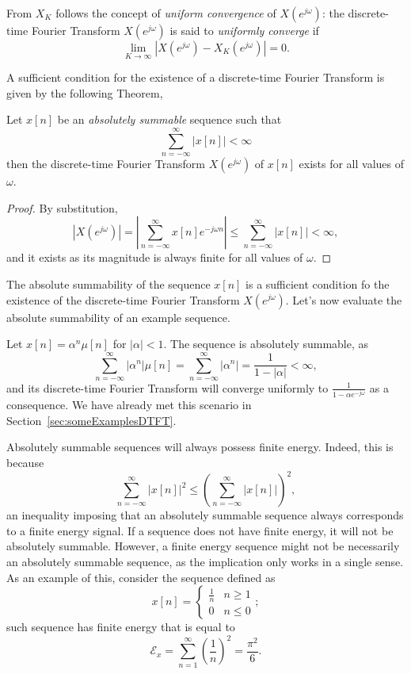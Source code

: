 \documentclass[\documentfontsize, twocolumn]{\classname}
\begin{document}
From $X_K$ follows the concept of \emph{uniform convergence} of $X(e^{j\omega})$: the discrete-time Fourier Transform $X(e^{j\omega})$ is said to \emph{uniformly converge} if
\begin{equation}\label{eqn:uniformConvergence}
    \lim_{K\rightarrow \infty}\left|X(e^{j\omega}) - X_K(e^{j\omega})\right| = 0.
\end{equation}

A sufficient condition for the existence of a discrete-time Fourier Transform is given by the following Theorem,
\begin{thm}\label{thm:existenceDTFT}
    Let $x[n]$ be an \emph{absolutely summable} sequence such that
    \[
        \sum_{n=-\infty}^{\infty}|x[n]| < \infty
    \]
    then the discrete-time Fourier Transform $X(e^{j\omega})$ of $x[n]$ exists for all values of $\omega$.
\end{thm}

\begin{proof}
    By substitution,
    \[
        \left|X(e^{j\omega})\right| = \left|\sum_{n=-\infty}^\infty x[n] e^{-j\omega n}\right| \leq \sum_{n=-\infty}^\infty|x[n]| < \infty,
    \]
    and it exists as its magnitude is always finite for all values of $\omega$.
\end{proof}

The absolute summability of the sequence $x[n]$ is a sufficient condition fo the existence of the discrete-time Fourier Transform $X(e^{j\omega})$. Let's now evaluate the absolute summability of an example sequence.

Let $x[n] = \alpha^n \mu[n]$ for $|\alpha| < 1$. The sequence is absolutely summable, as
\[
    \sum_{n=-\infty}^\infty |\alpha^n| \mu[n] = \sum_{n=-\infty}^\infty |\alpha^n| = \frac {1}{1-|\alpha|} < \infty,
\]
and its discrete-time Fourier Transform will converge uniformly to $\frac{1}{1-\alpha e^{-j\omega}}$ as a consequence. We have already met this scenario in Section~\ref{sec:someExamplesDTFT}.

Absolutely summable sequences will always possess finite energy. Indeed, this is because
\[
    \sum_{n=-\infty}^\infty |x[n]|^2 \leq \left(\sum_{n=-\infty}^\infty |x[n]|\right)^2,
\]
an inequality imposing that an absolutely summable sequence always corresponds to a finite energy signal. If a sequence does not have finite energy, it will not be absolutely summable. However, a finite energy sequence might not be necessarily an absolutely summable sequence, as the implication only works in a single sense. As an example of this, consider the sequence defined as
\[
    x[n] = \left\{\begin{array}{ll} \frac 1 n & n \geq 1 \\ 0 & n \leq 0\end{array}\right.;
\]
such sequence has finite energy that is equal to
\[
    \mathcal E_x = \sum_{n=1}^\infty \left(\frac 1 n\right)^2 = \frac {\pi^2}{6}.
\]
\end{document}
